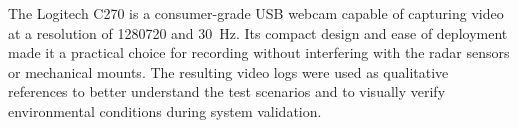 The Logitech C270 is a consumer-grade USB webcam capable of capturing video at a resolution of \SI{1280}{\times}\SI{720}{} and \SI{30}{\hertz}.  
Its compact design and ease of deployment made it a practical choice for recording without interfering with the radar sensors or mechanical mounts.  
The resulting video logs were used as qualitative references to better understand the test scenarios and to visually verify environmental conditions during system validation.  

